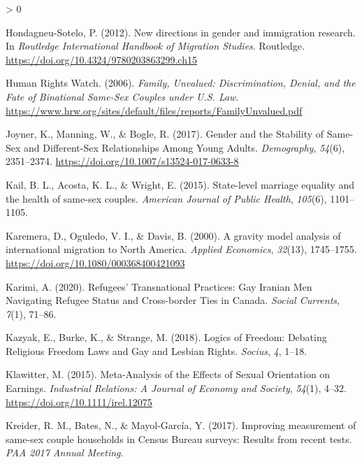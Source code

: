 \documentclass[
  11pt,
]{article}
\newlength{\cslhangindent}
\newenvironment{CSLReferences}[2] %
 {%
  \setlength{\parindent}{0pt}
  \ifodd #1 \everypar{\setlength{\hangindent}{\cslhangindent}}\ignorespaces\fi
  \ifnum #2 > 0
  \setlength{\parskip}{#2\baselineskip}
  \fi
 }%
 {}
\begin{document}
\begin{CSLReferences}{1}{0}
\leavevmode\hypertarget{ref-hondagneu-sotelo_2012}{}%
Hondagneu-Sotelo, P. (2012). New directions in gender and immigration research. In \emph{Routledge {International} {Handbook} of {Migration} {Studies}}. Routledge. \url{https://doi.org/10.4324/9780203863299.ch15}

\leavevmode\hypertarget{ref-humanrightswatch_2006}{}%
Human Rights Watch. (2006). \emph{Family, {Unvalued}: {Discrimination}, {Denial}, and the {Fate} of {Binational} {Same}-{Sex} {Couples} under {U}.{S}. {Law}}. \url{https://www.hrw.org/sites/default/files/reports/FamilyUnvalued.pdf}

\leavevmode\hypertarget{ref-joyner_2017}{}%
Joyner, K., Manning, W., \& Bogle, R. (2017). Gender and the {Stability} of {Same}-{Sex} and {Different}-{Sex} {Relationships} {Among} {Young} {Adults}. \emph{Demography}, \emph{54}(6), 2351--2374. \url{https://doi.org/10.1007/s13524-017-0633-8}

\leavevmode\hypertarget{ref-kail_2015}{}%
Kail, B. L., Acosta, K. L., \& Wright, E. (2015). State-level marriage equality and the health of same-sex couples. \emph{American Journal of Public Health}, \emph{105}(6), 1101--1105.

\leavevmode\hypertarget{ref-karemera_2000}{}%
Karemera, D., Oguledo, V. I., \& Davis, B. (2000). A gravity model analysis of international migration to {North} {America}. \emph{Applied Economics}, \emph{32}(13), 1745--1755. \url{https://doi.org/10.1080/000368400421093}

\leavevmode\hypertarget{ref-karimi_2020}{}%
Karimi, A. (2020). Refugees' {Transnational} {Practices}: {Gay} {Iranian} {Men} {Navigating} {Refugee} {Status} and {Cross}-border {Ties} in {Canada}. \emph{Social Currents}, \emph{7}(1), 71--86.

\leavevmode\hypertarget{ref-kazyak_2018}{}%
Kazyak, E., Burke, K., \& Strange, M. (2018). Logics of {Freedom}: {Debating} {Religious} {Freedom} {Laws} and {Gay} and {Lesbian} {Rights}. \emph{Socius}, \emph{4}, 1--18.

\leavevmode\hypertarget{ref-klawitter_2015}{}%
Klawitter, M. (2015). Meta-{Analysis} of the {Effects} of {Sexual} {Orientation} on {Earnings}. \emph{Industrial Relations: A Journal of Economy and Society}, \emph{54}(1), 4--32. \url{https://doi.org/10.1111/irel.12075}

\leavevmode\hypertarget{ref-kreider_2017}{}%
Kreider, R. M., Bates, N., \& Mayol-García, Y. (2017). Improving measurement of same-sex couple households in {Census} {Bureau} surveys: {Results} from recent tests. \emph{{PAA} 2017 Annual Meeting}.


\end{CSLReferences}
\end{document}
